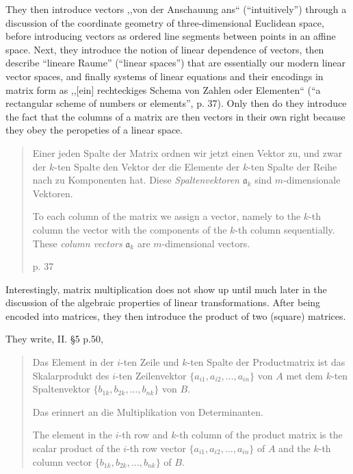 They then introduce vectors ,,von der Anschauung ans`` (``intuitively'') through a discussion of
the coordinate geometry of three-dimensional Euclidean space, before introducing
vectors as ordered line segments between points in an affine space. Next, they
introduce the notion of linear dependence of vectors, then describe ``lineare
Raume'' (``linear spaces'') that are essentially our modern linear vector spaces,
and finally systems of linear equations and their encodings in matrix form as
,,[ein] rechteckiges Schema von Zahlen oder Elementen`` (``a rectangular scheme
of numbers or elements'', p. 37).
Only then do they introduce the fact that the columns of a matrix are then vectors
in their own right because they obey the peropeties of a linear space.

\begin{quote}
    Einer jeden Spalte der Matrix ordnen wir jetzt einen Vektor zu, und zwar der
    $k$-ten Spalte den Vektor der die Elemente der $k$-ten Spalte der Reihe nach
    zu Komponenten hat. Diese \textit{Spaltenvektoren} $\mathfrak a_k$ sind
    $m$-dimensionale Vektoren.

    To each column of the matrix we assign a vector, namely to the $k$-th column
    the vector with the components of the $k$-th column sequentially.
    These \textit{column vectors} $\mathfrak a_k$ are $m$-dimensional vectors.

    p. 37
\end{quote}


Interestingly, matrix multiplication does not show up until much later in the
discussion of the algebraic properties of linear transformations. After being
encoded into matrices, they then introduce the product of two (square) matrices.

They write, II. \S 5 p.50,

\begin{quote}
Das Element in der $i$-ten Zeile und $k$-ten Spalte der Productmatrix ist das
Skalarprodukt des $i$-ten Zeilenvektor $\{a_{i1}, a_{i2}, \dots, a_{in}\}$
von $A$ met dem $k$-ten Spaltenvektor $\{b_{1k}, b_{2k}, \dots, b_{nk}\}$ von $B$.

Das erinnert an die Multiplikation von Determinanten.

The element in the $i$-th row and $k$-th column of the product matrix is the
scalar product of the $i$-th row vector $\{a_{i1}, a_{i2}, \dots, a_{in}\}$ of $A$
and the $k$-th column vector $\{b_{1k}, b_{2k}, \dots, b_{nk}\}$ of $B$.
\end{quote}



